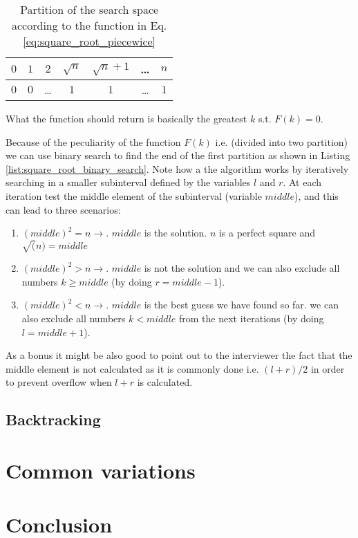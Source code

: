 \begin{table}[]
	\centering
	\begin{tabular}{|c|c|c|c|c|c|c|}
		\hline
		$0$ & $1$ & $2$   & $\sqrt{n}$ & $\sqrt{n}+1$ & \ldots   & $n$ \\ \hline
		$0$ & $0$ & \ldots & $1$ & $1$ & \ldots & $1$   \\ \hline
	\end{tabular}
\label{tab:sqrt_split_space}
\caption{Partition of the search space according to the function in Eq. \ref{eq:square_root_piecewice}}
\end{table}
What the function should return is basically the greatest $k$ s.t. $F(k)=0$. 

Because of the peculiarity of the function $F(k)$ i.e. (divided into two partition) we can use binary search to find the end of the first partition as shown in Listing \ref{list:square_root_binary_search}. Note how a the algorithm works by iteratively searching in a smaller subinterval defined by the variables $l$ and $r$. At each iteration test the middle element of the subinterval (variable $middle$), and this can lead to three scenarios:

\begin{enumerate}
 	\item $(middle)^2  = n \longrightarrow$. $middle$ is the solution. $n$ is a perfect square and $\sqrt(n)=middle$
 	\item $(middle)^2  > n \longrightarrow$. $middle$ is not the solution and we can also exclude all numbers $k \geq middle$ (by doing $r = middle-1$).
 	\item $(middle)^2  < n \longrightarrow$. $middle$ is the best guess we have found so far. we can also exclude all numbers $k < middle$ from the next iterations (by doing $l = middle+1$).
\end{enumerate}
As a bonus it might be also good to point out to the interviewer the fact that the middle element is not calculated as it is commonly done i.e. $(l+r)/2$ in order to prevent overflow when $l+r$ is calculated.

\begin{minipage}{\linewidth}
	
\end{minipage}

\subsection{Backtracking}



\section{Common variations}

\section{Conclusion}
